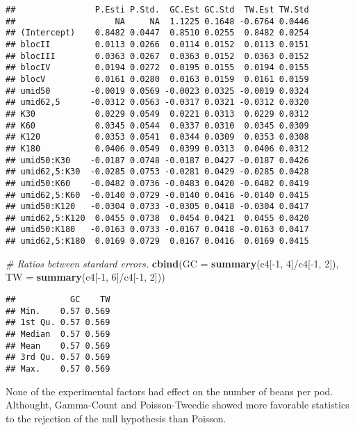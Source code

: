 \documentclass[9pt,a5paper,]{book}
\newenvironment{Shaded}{}{}
\newcommand{\KeywordTok}[1]{\textbf{{#1}}}
\newcommand{\DataTypeTok}[1]{\underline{{#1}}}
\newcommand{\DecValTok}[1]{{#1}}
\newcommand{\CommentTok}[1]{\textit{{#1}}}
\newcommand{\NormalTok}[1]{{#1}}
\renewenvironment{Shaded}{\color{inputcolor}}{}
\renewcommand{\DataTypeTok}[1]{{#1}}
\theoremstyle{definition}
\theoremstyle{definition}
\theoremstyle{remark}
\begin{document}
\begin{verbatim}
##                P.Esti P.Std.  GC.Est GC.Std  TW.Est TW.Std
##                    NA     NA  1.1225 0.1648 -0.6764 0.0446
## (Intercept)    0.8482 0.0447  0.8510 0.0255  0.8482 0.0254
## blocII         0.0113 0.0266  0.0114 0.0152  0.0113 0.0151
## blocIII        0.0363 0.0267  0.0363 0.0152  0.0363 0.0152
## blocIV         0.0194 0.0272  0.0195 0.0155  0.0194 0.0155
## blocV          0.0161 0.0280  0.0163 0.0159  0.0161 0.0159
## umid50        -0.0019 0.0569 -0.0023 0.0325 -0.0019 0.0324
## umid62,5      -0.0312 0.0563 -0.0317 0.0321 -0.0312 0.0320
## K30            0.0229 0.0549  0.0221 0.0313  0.0229 0.0312
## K60            0.0345 0.0544  0.0337 0.0310  0.0345 0.0309
## K120           0.0353 0.0541  0.0344 0.0309  0.0353 0.0308
## K180           0.0406 0.0549  0.0399 0.0313  0.0406 0.0312
## umid50:K30    -0.0187 0.0748 -0.0187 0.0427 -0.0187 0.0426
## umid62,5:K30  -0.0285 0.0753 -0.0281 0.0429 -0.0285 0.0428
## umid50:K60    -0.0482 0.0736 -0.0483 0.0420 -0.0482 0.0419
## umid62,5:K60  -0.0140 0.0729 -0.0140 0.0416 -0.0140 0.0415
## umid50:K120   -0.0304 0.0733 -0.0305 0.0418 -0.0304 0.0417
## umid62,5:K120  0.0455 0.0738  0.0454 0.0421  0.0455 0.0420
## umid50:K180   -0.0163 0.0733 -0.0167 0.0418 -0.0163 0.0417
## umid62,5:K180  0.0169 0.0729  0.0167 0.0416  0.0169 0.0415
\end{verbatim}

\begin{Shaded}
\begin{Highlighting}[]
\CommentTok{# Ratios between stardard errors.}
\KeywordTok{cbind}\NormalTok{(}\DataTypeTok{GC =} \KeywordTok{summary}\NormalTok{(c4[-}\DecValTok{1}\NormalTok{, }\DecValTok{4}\NormalTok{]/c4[-}\DecValTok{1}\NormalTok{, }\DecValTok{2}\NormalTok{]),}
      \DataTypeTok{TW =} \KeywordTok{summary}\NormalTok{(c4[-}\DecValTok{1}\NormalTok{, }\DecValTok{6}\NormalTok{]/c4[-}\DecValTok{1}\NormalTok{, }\DecValTok{2}\NormalTok{]))}
\end{Highlighting}
\end{Shaded}

\begin{verbatim}
##           GC    TW
## Min.    0.57 0.569
## 1st Qu. 0.57 0.569
## Median  0.57 0.569
## Mean    0.57 0.569
## 3rd Qu. 0.57 0.569
## Max.    0.57 0.569
\end{verbatim}

None of the experimental factors had effect on the number of beans per
pod. Althought, Gamma-Count and Poisson-Tweedie showed more favorable
statistics to the rejection of the null hypothesis than Poisson.
\end{document}

